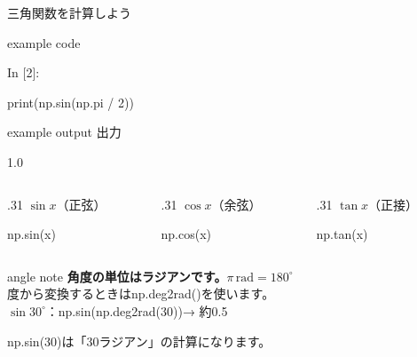 \documentclass[12pt,aspectratio=43]{beamer}
\newcommand{\pythonresult}[3]{%
  \begin{beamercolorbox}[wd=\linewidth,sep=1.8mm]{example code}
    {\codefont\fontsize{9}{10}\selectfont\textcolor{courseblue}{In [#1]:}\par}
    {\codefont\fontsize{16}{18}\selectfont\strut#2\par}
  \end{beamercolorbox}\par
  \begin{beamercolorbox}[wd=\linewidth,sep=.5mm,leftskip=1.3mm]{example output}
    {\fontsize{9}{11}\selectfont\textcolor{black!65}{出力}}\quad
    {\codefont\fontsize{16}{18}\selectfont\strut#3}
  \end{beamercolorbox}}
\begin{document}
\begin{frame}[t]{三角関数を計算しよう}
  \setlength{\parskip}{0pt}
  \pythonresult{2}
    {\textcolor{codebuiltin}{print}(np.\textcolor{codebuiltin}{sin}(np.pi / \textcolor{codevalue}{2}))}{1.0}
  \par\vspace{2mm}
  \begin{columns}[T,onlytextwidth]
    \begin{column}{.31\textwidth}
      \centering $\sin x$（正弦）\par
      {\codefont np.\textcolor{codebuiltin}{sin}(x)}
    \end{column}
    \begin{column}{.31\textwidth}
      \centering $\cos x$（余弦）\par
      {\codefont np.\textcolor{codebuiltin}{cos}(x)}
    \end{column}
    \begin{column}{.31\textwidth}
      \centering $\tan x$（正接）\par
      {\codefont np.\textcolor{codebuiltin}{tan}(x)}
    \end{column}
  \end{columns}
  \vspace{2mm}
  \begin{beamercolorbox}[wd=\textwidth,sep=1.5mm]{angle note}
    \textbf{角度の単位はラジアンです。}\quad $\pi\,\mathrm{rad}=180^\circ$\\[1mm]
    \small 度から変換するときは{\codefont np.deg2rad()}を使います。\\
    $\sin 30^\circ$：{\codefont np.sin(np.deg2rad(30))}\enspace → 約0.5
  \end{beamercolorbox}
  \par\vspace{1mm}
  {\small {\codefont np.sin(30)}は「30ラジアン」の計算になります。\par}
\end{frame}
\end{document}
